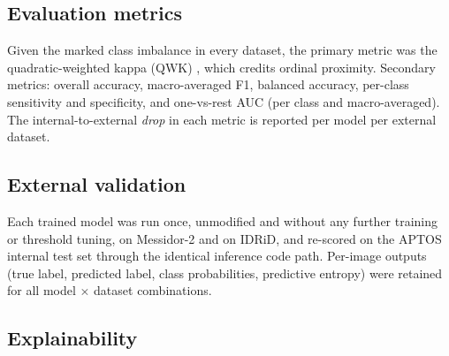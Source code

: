 \documentclass[journal]{IEEEtran}
\begin{document}
\subsection{Evaluation metrics}
\label{sec:methods-metrics}

Given the marked class imbalance in every dataset, the primary metric was the
quadratic-weighted kappa (QWK) \cite{cohen1968kappa}, which credits ordinal
proximity. Secondary metrics: overall accuracy, macro-averaged F1, balanced
accuracy, per-class sensitivity and specificity, and one-vs-rest AUC (per class
and macro-averaged). The internal-to-external \emph{drop} in each metric is
reported per model per external dataset.

\subsection{External validation}
\label{sec:methods-ext}

Each trained model was run once, unmodified and without any further training or
threshold tuning, on Messidor-2 and on IDRiD, and re-scored on the APTOS internal
test set through the identical inference code path. Per-image outputs (true label,
predicted label, class probabilities, predictive entropy) were retained for all
model $\times$ dataset combinations.

\subsection{Explainability}
\label{sec:methods-explain}
\end{document}
